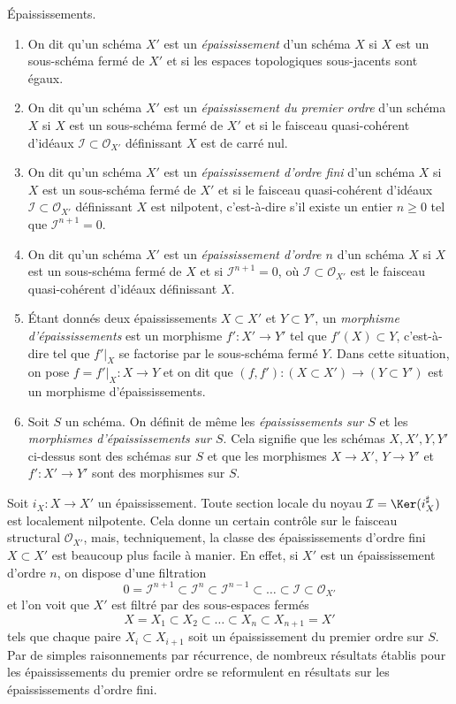\begin{definition}
\label{definition-thickening}
Épaississements.
\begin{enumerate}
\item On dit qu'un schéma $X'$ est un {\it épaississement} d'un schéma $X$ si
$X$ est un sous-schéma fermé de $X'$ et si les espaces topologiques sous-jacents
sont égaux.
\item On dit qu'un schéma $X'$ est un {\it épaississement du premier ordre} d'un schéma $X$ si
$X$ est un sous-schéma fermé de $X'$ et si le faisceau quasi-cohérent d'idéaux
$\mathcal{I} \subset \mathcal{O}_{X'}$ définissant $X$ est de carré nul.
\item On dit qu'un schéma $X'$ est un {\it épaississement d'ordre fini} d'un schéma $X$
si $X$ est un sous-schéma fermé de $X'$ et si le faisceau quasi-cohérent d'idéaux
$\mathcal{I} \subset \mathcal{O}_{X'}$ définissant $X$ est nilpotent, c'est-à-dire
s'il existe un entier $n \geq 0$ tel que $\mathcal{I}^{n + 1} = 0$.
\item On dit qu'un schéma $X'$ est un {\it épaississement d'ordre $n$} d'un schéma $X$
si $X$ est un sous-schéma fermé de $X$ et si $\mathcal{I}^{n + 1} = 0$,
où $\mathcal{I} \subset \mathcal{O}_{X'}$ est le
faisceau quasi-cohérent d'idéaux définissant $X$.
\item Étant donnés deux épaississements $X \subset X'$ et $Y \subset Y'$, un
{\it morphisme d'épaississements} est un morphisme $f' : X' \to Y'$ tel que
$f'(X) \subset Y$, c'est-à-dire tel que $f'|_X$ se factorise par le sous-schéma
fermé $Y$. Dans cette situation, on pose $f = f'|_X : X \to Y$ et on dit
que $(f, f') : (X \subset X') \to (Y \subset Y')$ est un morphisme
d'épaississements.
\item Soit $S$ un schéma. On définit de même les {\it épaississements sur $S$} et
les {\it morphismes d'épaississements sur $S$}. Cela signifie que les schémas
$X, X', Y, Y'$ ci-dessus sont des schémas sur $S$ et que les morphismes
$X \to X'$, $Y \to Y'$ et $f' : X' \to Y'$ sont des morphismes sur $S$.
\end{enumerate}
\end{definition}

\noindent
Soit $i_X : X \to X'$ un épaississement. Toute section locale du noyau
$\mathcal{I} = \Ker(i_X^\sharp)$ est localement nilpotente. Cela donne
un certain contrôle sur le faisceau structural $\mathcal{O}_{X'}$, mais,
techniquement, la classe des épaississements d'ordre fini $X \subset X'$
est beaucoup plus facile à manier. En effet, si $X'$ est un épaississement d'ordre $n$,
on dispose d'une filtration
$$
0 = \mathcal{I}^{n + 1} \subset
\mathcal{I}^n \subset
\mathcal{I}^{n - 1} \subset \ldots \subset
\mathcal{I} \subset \mathcal{O}_{X'}
$$
et l'on voit que $X'$ est filtré par des sous-espaces fermés
$$
X = X_1 \subset X_2 \subset \ldots \subset X_n \subset X_{n + 1} = X'
$$
tels que chaque paire $X_i \subset X_{i + 1}$ soit un épaississement du premier ordre
sur $S$. Par de simples raisonnements par récurrence, de nombreux résultats établis pour
les épaississements du premier ordre se reformulent en résultats sur les épaississements d'ordre fini.

